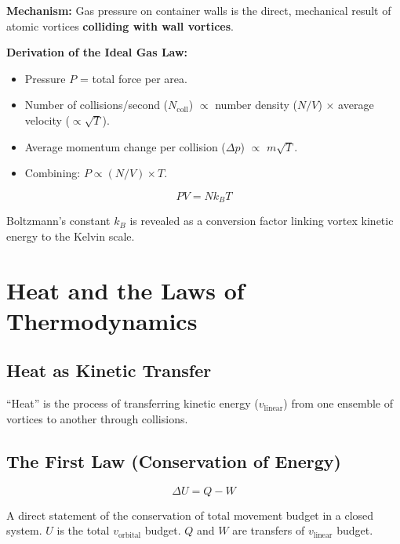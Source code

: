 \textbf{Mechanism:} Gas pressure on container walls is the direct, mechanical result of atomic vortices \textbf{colliding with wall vortices}.

\textbf{Derivation of the Ideal Gas Law:}
\begin{itemize}
  \item Pressure $P$ = total force per area.
  \item Number of collisions/second ($N_{\text{coll}}$) $\propto$ number density ($N/V$) $\times$ average velocity ($\propto \sqrt{T}$).
  \item Average momentum change per collision ($\Delta p$) $\propto$ $m\sqrt{T}$.
  \item Combining: $P \propto (N/V) \times T$.
\end{itemize}

\begin{equation}\label{eq:ideal-gas}
  \boxed{PV = Nk_B T}
\end{equation}

Boltzmann's constant $k_B$ is revealed as a conversion factor linking vortex kinetic energy to the Kelvin scale.


\section{Heat and the Laws of Thermodynamics}

\subsection{Heat as Kinetic Transfer}

``Heat'' is the process of transferring kinetic energy ($v_{\text{linear}}$) from one ensemble of vortices to another through collisions.

\subsection{The First Law (Conservation of Energy)}

\begin{equation}
  \Delta U = Q - W
\end{equation}

A direct statement of the conservation of total movement budget in a closed system.  $U$ is the total $v_{\text{orbital}}$ budget.  $Q$ and $W$ are transfers of $v_{\text{linear}}$ budget.

